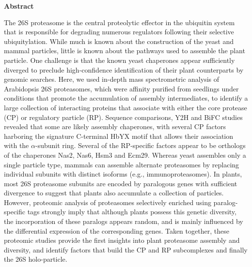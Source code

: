 \textbf{Abstract}

The 26S proteasome is the central proteolytic effector in the ubiquitin system that is responsible for degrading numerous regulators following their selective ubiquitylation.
While much is known about the construction of the yeast and mammal particles, little is known about the pathways used to assemble the plant particle.
One challenge is that the known yeast chaperones appear sufficiently diverged to preclude high-confidence identification of their plant counterparts by genomic searches.
Here, we used in-depth mass spectrometric analysis of Arabidopsis 26S proteasomes, which were affinity purified from seedlings under conditions that promote the accumulation of assembly intermediates, to identify a large collection of interacting proteins that associate with either the core protease (CP) or regulatory particle (RP).
Sequence comparisons, Y2H and BiFC studies revealed that some are likely assembly chaperones, with several CP factors harboring the signature C-terminal HbYX motif that allows their association with the $\alpha$-subunit ring.
Several of the RP-specific factors appear to be orthologs of the chaperones Nas2, Nas6, Hsm3 and Ecm29.
Whereas yeast assembles only a single particle type, mammals can assemble alternate proteasomes by replacing individual subunits with distinct isoforms (e.g., immunoproteasomes).
In plants, most 26S proteasome subunits are encoded by paralogous genes with sufficient divergence to suggest that plants also accumulate a collection of particles.
However, proteomic analysis of proteasomes selectively enriched using paralog-specific tags strongly imply that although plants possess this genetic diversity, the incorporation of these paralogs appears random, and is mainly influenced by the differential expression of the corresponding genes.
Taken together, these proteomic studies provide the first insights into plant proteasome assembly and diversity, and identify factors that build the CP and RP subcomplexes and finally the 26S holo-particle. 
